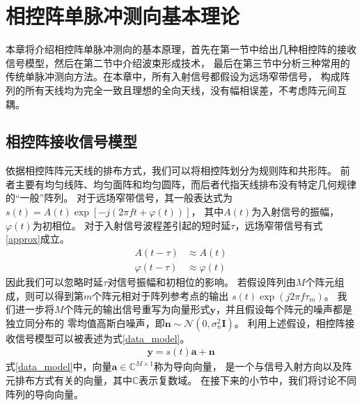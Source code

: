 \documentclass[master]{thesis-uestc}
\begin{document}
\chapter{相控阵单脉冲测向基本理论}
本章将介绍相控阵单脉冲测向的基本原理，首先在第一节中给出几种相控阵的接收信号模型，然后在第二节中介绍波束形成技术，
最后在第三节中分析三种常用的传统单脉冲测向方法。在本章中，所有入射信号都假设为远场窄带信号，
构成阵列的所有天线均为完全一致且理想的全向天线，没有幅相误差，不考虑阵元间互耦。

\section{相控阵接收信号模型}
依据相控阵阵元天线的排布方式，我们可以将相控阵划分为规则阵和共形阵。
前者主要有均匀线阵、均匀面阵和均匀圆阵，而后者代指天线排布没有特定几何规律的“一般”阵列。
对于远场窄带信号，其一般表达式为$s(t)=A(t)\exp\left[-j\left(2\pi ft+\varphi(t)\right)\right]$，
其中$A(t)$为入射信号的振幅，$\varphi(t)$为初相位。
对于入射信号波程差引起的短时延$\tau$，远场窄带信号有式\eqref{approx}成立。
\begin{equation}\label{approx}
\begin{aligned}
    A(t-\tau) &\approx A(t) \\
    \varphi(t-\tau) &\approx \varphi(t)
\end{aligned}
\end{equation}
因此我们可以忽略时延$\tau$对信号振幅和初相位的影响。
若假设阵列由$M$个阵元组成，则可以得到第$m$个阵元相对于阵列参考点的输出
$s(t)\exp\left(j2\pi f\tau_m\right)$。
我们进一步将$M$个阵元的输出信号重写为向量形式$\bm{y}$，并且假设每个阵元的噪声都是独立同分布的
零均值高斯白噪声，即$\bm{n}\sim\mathcal{N}\left(0,\sigma^2_n\bm{I}\right)$。
利用上述假设，相控阵接收信号模型可以被表述为式\eqref{data_model}。
\begin{equation}\label{data_model}
    \begin{aligned}
        \bm{y} = s(t)\bm{a} + \bm{n}
    \end{aligned}
\end{equation}
式\eqref{data_model}中，向量$\bm{a}\in\mathbb{C}^{M\times1}$称为导向向量，
是一个与信号入射方向以及阵元排布方式有关的向量，其中$\mathbb{C}$表示复数域。
在接下来的小节中，我们将讨论不同阵列的导向向量。
\end{document}
